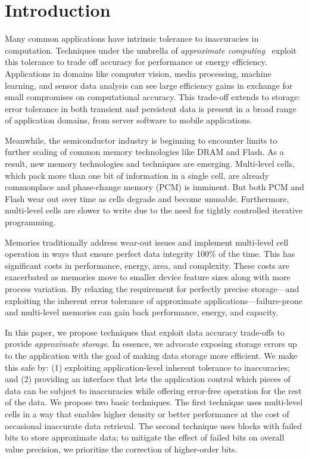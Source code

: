 \documentclass[prodmode,acmtocs]{acmsmall}
\begin{document}
\maketitle

\section{Introduction}
\label{sec:intro}

Many common applications have intrinsic tolerance to inaccuracies in
computation. Techniques under the umbrella of {\em approximate
computing}~\cite{enerj,truffle,pcmos,green,stochasticproc,relax,perforation,flikker,ersa} exploit this tolerance
to trade off accuracy for performance or energy efficiency. Applications
in domains like computer vision, media processing, machine learning, and
sensor data analysis can see large efficiency gains in exchange for
small compromises on computational accuracy. This trade-off extends to
storage: error tolerance in both transient and persistent data is
present in a broad range of application domains, from server software to
mobile applications.

Meanwhile, the semiconductor industry is beginning to encounter limits to
further scaling of common memory technologies like DRAM and Flash. As a
result, new memory technologies and techniques are emerging. Multi-level cells,
which pack more than one bit of information in a single cell,
are already commonplace and phase-change memory (PCM) is imminent.
But both
PCM and Flash wear out over time as cells degrade and become unusable. Furthermore, multi-level cells
are slower to write due to the need for tightly
controlled iterative programming.

Memories traditionally address wear-out issues and implement multi-level cell
operation in ways that ensure perfect data integrity 100\% of the time. This
has significant costs in performance, energy, area, and complexity. These
costs are exacerbated as memories move to smaller device feature sizes along
with more process variation. By relaxing the requirement for perfectly precise
storage---and exploiting the inherent error tolerance of approximate
applications---failure-prone and multi-level memories can gain back
performance, energy, and capacity.

In this paper, we propose techniques that exploit data accuracy trade-offs to
provide \emph{approximate storage}. In essence, we advocate exposing storage
errors up to the application with the goal of making data storage more
efficient. We make this safe by: (1) exploiting application-level inherent
tolerance to inaccuracies; and (2) providing an interface that lets the
application control which pieces of data can be subject to inaccuracies while offering error-free operation for the rest of the data.
We propose two basic techniques. The first
technique uses multi-level cells in a way that enables higher density or
better performance at the cost of occasional inaccurate data retrieval. The
second technique uses blocks with failed bits to store approximate data; to
mitigate the effect of failed bits on overall value precision, we prioritize
the correction of higher-order bits.
\end{document}
